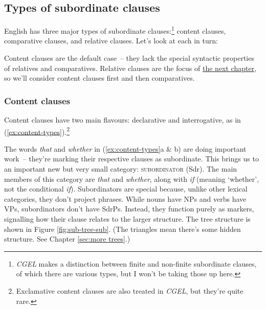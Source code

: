 \subsection{Types of subordinate clauses}

English has three major types of subordinate clauses:\footnote{\textit{CGEL} makes a distinction between finite and non-finite subordinate clauses, of which there are various types, but I won't be taking those up here.} content clauses, comparative clauses, and relative clauses. Let's look at each in turn:

\ea \label{ex:sub-types}
    \z
\z

Content clauses are the default case~-- they lack the special syntactic properties of relatives and comparatives. Relative clauses are the focus of \href{ch:relatives}{the next chapter}, so we'll consider content clauses first and then comparatives.

\subsubsection{Content clauses}

Content clauses have two main flavours: declarative and interrogative, as in (\ref{ex:content-types}).\footnote{Exclamative content clauses are also treated in \textit{CGEL}, but they're quite rare.}

\ea \label{ex:content-types}
    \z
\z

The words \textit{that} and \textit{whether} in (\ref{ex:content-types}a \& b) are doing important work~-- they're marking their respective clauses as subordinate. This brings us to an important new but very small category: \textsc{subordinator} (Sdr). The main members of this category are \textit{that} and \textit{whether}, along with \textit{if} (meaning `whether', not the conditional \textit{if}). Subordinators are special because, unlike other lexical categories, they don't project phrases. While nouns have NPs and verbs have VPs, subordinators don't have SdrPs. Instead, they function purely as markers, signalling how their clause relates to the larger structure. The tree structure is shown in Figure \ref{fig:sub-tree-sub}. (The triangles mean there's some hidden structure. See Chapter \ref{sec:more trees}.)

